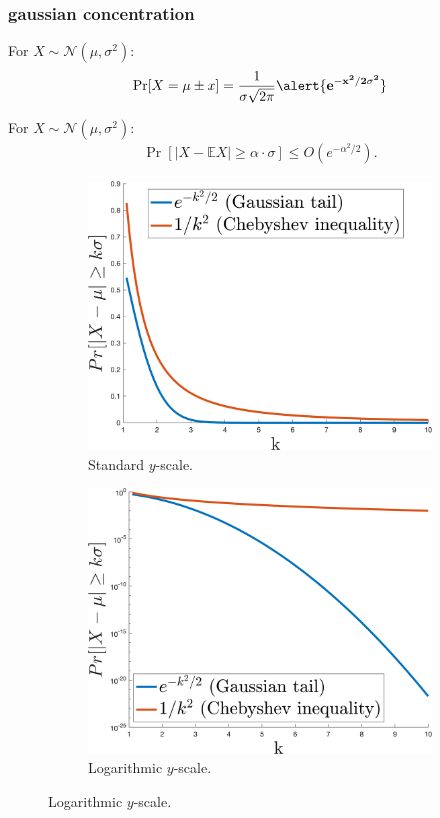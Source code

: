 \documentclass[handout,compress]{beamer}
\newcommand{\E}{\mathbb{E}}
\begin{document}
\begin{frame}
	\frametitle{gaussian concentration}
	For $X \sim \mathcal{N}(\mu,\sigma^2)$:
	\begin{align*}
		\Pr[X = \mu \pm x] = \frac{1}{\sigma\sqrt{2\pi}} \alert{\mathbf{e^{-x^2/2\sigma^2}}}
	\end{align*}
		\vspace{-1em}
		\begin{lemma}
			For $X \sim \mathcal{N}(\mu,\sigma^2)$:
			\begin{align*}
				\Pr[|X - \E X| \geq \alpha\cdot\sigma] \leq O(e^{-\alpha^2/2}).
			\end{align*}
		\end{lemma}
		\begin{figure}
			\begin{subfigure}[t]{0.3\textwidth}
				\centering
				\includegraphics[width=\textwidth]{standardScale.png}
				\caption{Standard $y$-scale.}
			\end{subfigure}
			\hspace{3em}
			\begin{subfigure}[t]{0.3\textwidth}
				\centering
				\includegraphics[width=\textwidth]{logScale.png}
				\caption{Logarithmic $y$-scale.}
			\end{subfigure}
		\end{figure}
	

\end{frame}
\end{document}

